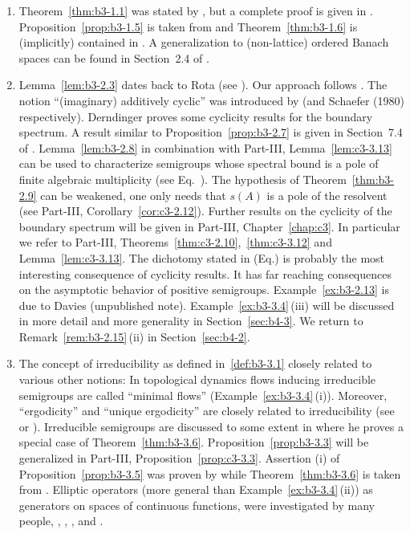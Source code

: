 \begin{enumerate}[label=\emph{Section \arabic*:}, wide]

\item
Theorem~\ref{thm:b3-1.1} was stated by \textcite{karlin:1959}, but a complete proof is given in \textcite{derndinger:1980}.
Proposition~\ref{prop:b3-1.5}  is taken from \textcite{greiner:1982} and Theorem~\ref{thm:b3-1.6} is (implicitly) contained in \textcite{derndingernagel:1979}.
A generalization to (non-lattice) ordered Banach spaces can be found in Section~2.4 of \textcite{battyrobinson:1984}.

\item
Lemma~\ref{lem:b3-2.3} dates back to Rota (see \textcite{schaefer:1974}).
Our approach follows \textcite{greiner:1981}.
The notion \enquote{(imaginary) additively cyclic} was introduced by \textcite{derndinger:1980} (and {Schaefer (1980)} respectively).
Derndinger proves some cyclicity results for the boundary spectrum.
A result similar to Proposition~\ref{prop:b3-2.7} is given in Section~7.4 of \textcite{davies:1980}.
Lemma~\ref{lem:b3-2.8} in combination with Part-III, Lemma~\ref{lem:c3-3.13}  can be used to characterize semigroups whose spectral bound is a pole of finite algebraic multiplicity (see Eq.~).
The hypothesis of Theorem~\ref{thm:b3-2.9} can be weakened, one only needs that $s(A)$ is a pole of the resolvent (see Part-III, Corollary~\ref{cor:c3-2.12}).
Further results on the cyclicity of the boundary spectrum will be given in Part-III, Chapter~\ref{chap:c3}.
In particular we refer to Part-III, Theorems~\ref{thm:c3-2.10},~\ref{thm:c3-3.12} and Lemma~\ref{lem:c3-3.13}.
The dichotomy stated in (Eq.)  is probably the most interesting consequence of cyclicity results.
It has far reaching consequences on the asymptotic behavior of positive semigroups.
Example~\ref{ex:b3-2.13} is due to Davies (unpublished note).
Example~\ref{ex:b3-3.4}\,(iii) will be discussed in more detail and more generality in Section~\ref{sec:b4-3}.
We return to Remark~\ref{rem:b3-2.15}\,(ii) in Section~\ref{sec:b4-2}.

\item
The concept of irreducibility as defined in~\ref{def:b3-3.1} closely related to various other notions:
In topological dynamics flows inducing irreducible semigroups are called \enquote{minimal flows} (\cf Example~\ref{ex:b3-3.4}\,(i)).
Moreover, \enquote{ergodicity} and \enquote{unique ergodicity} are closely related to irreducibility (see \textcite{cornfeldetal:1982} or \textcite{krengel:1985}).
Irreducible semigroups are discussed to some extent in \textcite{davies:1980} where he proves a special case of Theorem~\ref{thm:b3-3.6}.
Proposition~\ref{prop:b3-3.3} will be generalized in Part-III, Proposition~\ref{prop:c3-3.3}.
Assertion (i) of Proposition~\ref{prop:b3-3.5} was proven by \textcite{schaefer:1982} while Theorem~\ref{thm:b3-3.6} is taken from \textcite{greiner:1982}.
Elliptic operators (more general than Example~\ref{ex:b3-3.4}\,(ii)) as generators on spaces of continuous functions, were investigated by many people, \eg \textcite{bonyetal:1968}, \textcite{kuhn:1984}, \textcite{roth:1976}, \textcite{roth:1978} and \textcite{stewart:1974}.


\end{enumerate}
